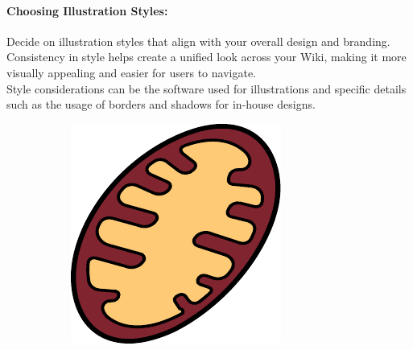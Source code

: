 \paragraph{Choosing Illustration Styles:} Decide on illustration styles that align with your overall design and branding.
Consistency in style helps create a unified look across your Wiki, making it more visually appealing and easier for users to navigate. \\
Style considerations can be the software used for illustrations and specific details such as the usage of borders and shadows for in-house designs.
\begin{figure}[h]
    \centering
    \begin{subfigure}[t]{0.2\linewidth}
        \includegraphics[width=\textwidth]{chapters/images/mitochondria-black-lines}
    \end{subfigure}
    \begin{subfigure}[t]{0.2\linewidth}

\end{subfigure}
\end{figure}
